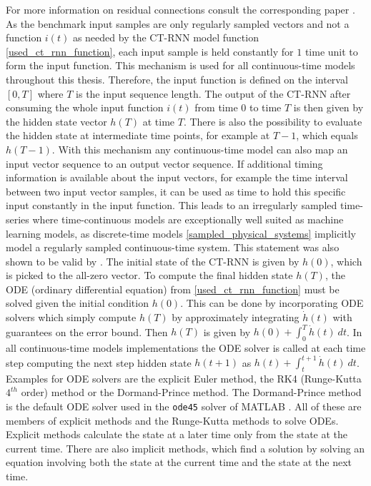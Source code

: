 \documentclass[draft,final]{vutinfth} %
\begin{document}
    For more information on residual connections consult the corresponding paper \cite{ResNet}.
    As the benchmark input samples are only regularly sampled vectors and not a function $i(t)$ as needed by the CT-RNN model function \ref{used_ct_rnn_function}, each input sample is held constantly for $1$ time unit to form the input function.
    This mechanism is used for all continuous-time models throughout this thesis.
    Therefore, the input function is defined on the interval $[0,T]$ where $T$ is the input sequence length.
    The output of the CT-RNN after consuming the whole input function $i(t)$ from time $0$ to time $T$ is then given by the hidden state vector $h(T)$ at time $T$.
    There is also the possibility to evaluate the hidden state at intermediate time points, for example at $T-1$, which equals $h(T-1)$.
    With this mechanism any continuous-time model can also map an input vector sequence to an output vector sequence.
    If additional timing information is available about the input vectors, for example the time interval between two input vector samples, it can be used as time to hold this specific input constantly in the input function.
    This leads to an irregularly sampled time-series where time-continuous models are exceptionally well suited as machine learning models, as discrete-time models \ref{sampled_physical_systems} implicitly model a regularly sampled continuous-time system.
    This statement was also shown to be valid by \cite{ODELSTM}.
    The initial state of the CT-RNN is given by $h(0)$, which is picked to the all-zero vector.
    To compute the final hidden state $h(T)$, the ODE (ordinary differential equation) from \ref{used_ct_rnn_function} must be solved given the initial condition $h(0)$.
    This can be done by incorporating ODE solvers which simply compute $h(T)$ by approximately integrating $\dot h(t)$ with guarantees on the error bound.
    Then $h(T)$ is given by $h(0) + \int_0^T{\dot h(t)}~dt$. 
    In all continuous-time models implementations the ODE solver is called at each time step computing the next step hidden state $h(t+1)$ as $h(t) + \int_t^{t+1}{\dot h(t)}~dt$.
    Examples for ODE solvers are the explicit Euler method, the RK4 (Runge-Kutta $4^{th}$ order) method or the Dormand-Prince method.
    The Dormand-Prince method is the default ODE solver used in the \texttt{ode45} solver of MATLAB \cite{MATLAB}.
    All of these are members of explicit methods and the Runge-Kutta methods to solve ODEs. Explicit methods calculate the state at a later time only from the state at the current time.
    There are also implicit methods, which find a solution by solving an equation involving both the state at the current time and the state at the next time.
\end{document}
